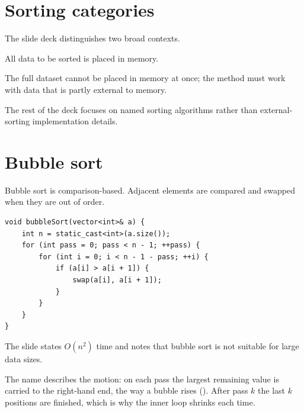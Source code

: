 \section{Sorting categories}

The slide deck distinguishes two broad contexts.

\begin{description}[leftmargin=1.35in,style=nextline]
  \item[Internal sorting] All data to be sorted is placed in memory.
  \item[External sorting] The full dataset cannot be placed in memory at once; the method must work with data that is partly external to memory.
\end{description}

The rest of the deck focuses on named sorting algorithms rather than external-sorting implementation details.

\section{Bubble sort}

Bubble sort is comparison-based. Adjacent elements are compared and swapped when they are out of order.

\begin{lstlisting}
void bubbleSort(vector<int>& a) {
    int n = static_cast<int>(a.size());
    for (int pass = 0; pass < n - 1; ++pass) {
        for (int i = 0; i < n - 1 - pass; ++i) {
            if (a[i] > a[i + 1]) {
                swap(a[i], a[i + 1]);
            }
        }
    }
}
\end{lstlisting}

The slide states $O(n^2)$ time and notes that bubble sort is not suitable for large data sizes.

The name describes the motion: on each pass the largest remaining value is carried to the
right-hand end, the way a bubble rises (). After pass $k$ the last $k$
positions are finished, which is why the inner loop shrinks each time.


